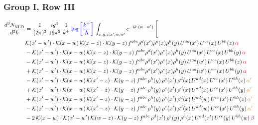 \documentclass[9pt]{article}
\numberwithin{equation}{section}
\begin{document}
\subsubsection{Group I, Row III}
\begin{align}
    \frac{d^{3}N_{\rm NLO}^{\rm}}{d^{3}k}  & = \frac{1}{(2\pi)^{3}}\, \frac{ig^{4}}{16\pi^{5}}\, \frac{1}{k^{+}}\, {\color{blue}\log{\left[\frac{k^{+}}{\Lambda}\right]}}\, \int_{x,y,z,x^{\prime},w,w^{\prime}}e^{-ik\cdot (w-w')}\, \Bigg[\notag \\ & \mathcal{K}(x'-w')\cdot \mathcal{K}(x-w)\, \mathcal{K}(x-z)\cdot \mathcal{K}(y-z)\, f^{abc}\rho^{d}(x')\rho^{e}(x)\rho^{h}(y)\, U^{ad}(x')\,U^{ce}(x)\, U^{bh}(z)\,{\color{red} \alpha}\notag\\ & - \mathcal{K}(x'-w')\cdot \mathcal{K}(x-w)\, \mathcal{K}(x-z)\cdot \mathcal{K}(y-z)\, f^{abc}\rho^{d}(x')\rho^{e}(x)\rho^{h}(y)\, U^{ad}(x')\,U^{ce}(x)\, U^{bh}(y)\,{\color{red} \alpha}\notag \\ &-\mathcal{K}(x'-w')\cdot \mathcal{K}(x-w)\, \mathcal{K}(x-z)\cdot \mathcal{K}(y-z)\, f^{abc}\rho^{d}(x')\rho^{e}(x)\rho^{h}(y)\, U^{ad}(w')\,U^{ce}(x)\, U^{bh}(z)\,{\color{red} \alpha}\notag \\ & +\mathcal{K}(x'-w')\cdot \mathcal{K}(x-w)\, \mathcal{K}(x-z)\cdot \mathcal{K}(y-z)\, f^{abc}\rho^{d}(x')\rho^{e}(x)\rho^{h}(y)\, U^{ad}(w')\,U^{ce}(x)\, U^{bh}(y)\,{\color{red} \alpha}\notag \\ & -\mathcal{K}(x'-w')\cdot\mathcal{K}(x-w)\,\mathcal{K}(x'-z)\cdot\mathcal{K}(y-z)\, f^{abc}\,\rho^{h}(y)\,\rho^{e}(x')\,\rho^{d}(x)\,U^{ad}(x)\,U^{ce}(x')\,U^{bh}(z)\,{\color{orange} \alpha'}\notag \\ &+\mathcal{K}(x'-w')\cdot\mathcal{K}(x-w)\,\mathcal{K}(x'-z)\cdot\mathcal{K}(y-z)\, f^{abc}\,\rho^{h}(y)\,\rho^{e}(x')\,\rho^{d}(x)\,U^{ad}(x)\,U^{ce}(x')\,U^{bh}(y)\,{\color{orange} \alpha'}\notag \\ & +\mathcal{K}(x'-w')\cdot\mathcal{K}(x-w)\,\mathcal{K}(x'-z)\cdot\mathcal{K}(y-z)\, f^{abc}\,\rho^{h}(y)\,\rho^{e}(x')\,\rho^{d}(x)\,U^{ad}(w)\,U^{ce}(x')\,U^{bh}(z)\,{\color{orange} \alpha'}\notag \\ & -\mathcal{K}(x'-w')\cdot\mathcal{K}(x-w)\,\mathcal{K}(x'-z)\cdot\mathcal{K}(y-z)\, f^{abc}\,\rho^{h}(y)\,\rho^{e}(x')\,\rho^{d}(x)\,U^{ad}(w)\,U^{ce}(x')\,U^{bh}(y)\,{\color{orange} \alpha'}\notag \\ & -2\,\mathcal{K}(x-w)\cdot\mathcal{K}(x'-w')\,\mathcal{K}(w-z)\cdot\mathcal{K}(y-z)\, f^{abc}\,\rho^{d}(x')\,\rho^{e}(y)\,\rho^{h}(x)\,U^{ad}(x')\,U^{ce}(y)\,U^{bh}(w)\,{\color{violet} \beta}\notag\\

\end{align}
\end{document}
